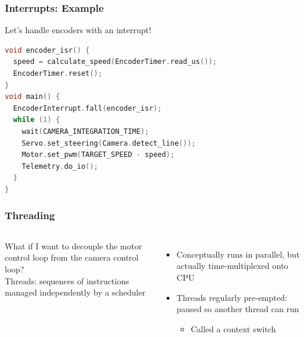 \documentclass{beamer}
\begin{document}
\begin{frame}[fragile]
\frametitle{Interrupts: Example}
Let's handle encoders with an interrupt!
\vspace{2px}
\begin{lstlisting}[language=C++,basicstyle=\ttfamily\scriptsize]
void encoder_isr() {
  speed = calculate_speed(EncoderTimer.read_us());
  EncoderTimer.reset();
}
void main() {
  EncoderInterrupt.fall(encoder_isr);
  while (1) {
    wait(CAMERA_INTEGRATION_TIME);
    Servo.set_steering(Camera.detect_line());    
    Motor.set_pwm(TARGET_SPEED - speed);
    Telemetry.do_io();
  }
}
\end{lstlisting}
\vspace{2px}
\end{frame}

\begin{frame}
\frametitle{Threading}
\begin{columns}[t]
What if I want to decouple the motor control loop from the camera control loop? \\
\vspace{5px}
Threads: sequences of instructions managed independently by a scheduler
\begin{itemize}
  \item Conceptually runs in parallel, but actually time-multiplexed onto CPU
  \item Threads regularly pre-empted: paused so another thread can run
  \begin{itemize}
    \item Called a context switch
  \end{itemize}
\end{itemize}

\end{columns}
\end{frame}
\end{document}

